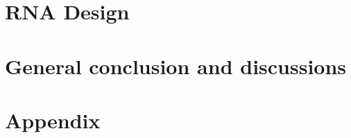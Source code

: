 \documentclass[ twoside,openright,titlepage,numbers=noenddot,%
                headinclude,footinclude,cleardoublepage=empty,abstract=on,
                BCOR=5mm,paper=a4,fontsize=12pt,dvipsnames
                ]{scrreprt}
\begin{document}
\part{RNA Design}\label{pt:inversefolding}


\part{General conclusion and discussions }\label{discusion}


\appendix
\cleardoublepage
\part{Appendix}


\cleardoublepage
\cleardoublepage




\end{document}
